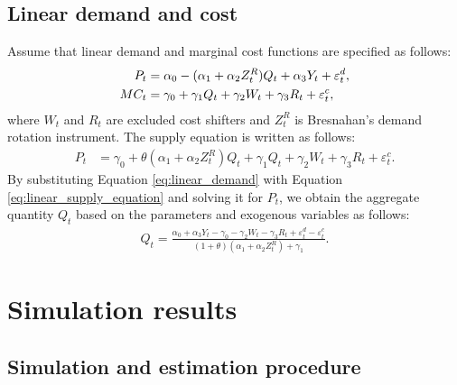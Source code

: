 \documentclass[11pt, a4paper]{article}
\begin{document}
\subsection{Linear demand and cost}
Assume that linear demand and marginal cost functions are specified as follows:
\begin{align}
    P_{t} &= \alpha_0 - (\alpha_1 + \alpha_2Z^{R}_{t})Q_{t} + \alpha_3 Y_{t} + \varepsilon^{d}_{t},\label{eq:linear_demand}\\
    MC_{t} &= \gamma_0  + \gamma_1 Q_{t} + \gamma_2 W_{t} + \gamma_3 R_{t} + \varepsilon^{c}_{t},\label{eq:linear_{t}arginal_cost}
\end{align}
where $W_{t}$ and $R_{t}$ are excluded cost shifters and $Z^{R}_{t}$ is Bresnahan's demand rotation instrument. 
The supply equation is written as follows:
\begin{align}
    P_{t} 
    &= \gamma_0 + \theta (\alpha_1 + \alpha_2 Z^{R}_{t})Q_{t} + \gamma_1 Q_{t} + \gamma_2 W_{t} + \gamma_3 R_{t} +\varepsilon^c_{t}.\label{eq:linear_supply_equation}\end{align}
By substituting Equation \eqref{eq:linear_demand} with Equation \eqref{eq:linear_supply_equation} and solving it for $P_{t}$, we obtain the aggregate quantity $Q_{t}$ based on the parameters and exogenous variables as follows:
\begin{align}
    Q_{t} =  \frac{\alpha_0 + \alpha_3 Y_{t} - \gamma_0 - \gamma_2 W_{t} - \gamma_3 R_{t} + \varepsilon^{d}_{t} - \varepsilon^{c}_{t}}{(1 + \theta) (\alpha_1 + \alpha_2 Z^{R}_{t}) + \gamma_1}.\label{eq:quantity_linear}
\end{align}


\section{Simulation results}\label{sec:results}

\subsection{Simulation and estimation procedure}
\end{document}

